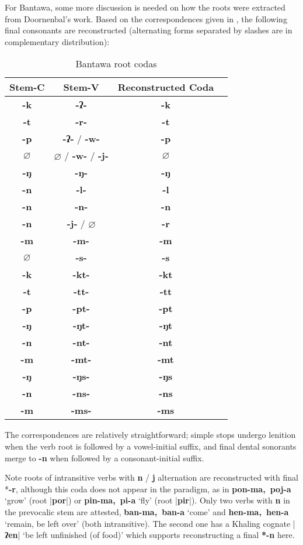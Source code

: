 \documentclass[oneside,a4paper,11pt]{article}
\newcommand{\ipa}[1]{\textbf{{\phon\mbox{#1}}}} %
\newcommand{\dhatu}[2]{|\ipa{#1}| `#2'}
\begin{document}
 For Bantawa, some more discussion is needed on how the roots were extracted from Doornenbal's work. Based on the correspondences given in \citet[129; 132]{doornenbal09}, the following final consonants are reconstructed (alternating forms separated by slashes are in complementary distribution):

\begin{table}[h]
\caption{Bantawa root codas} \centering \label{tab:bantawa.root}
\begin{tabular}{cccc}
\toprule
Stem-C & Stem-V & Reconstructed Coda \\
\midrule
\ipa{-k} & \ipa{-ʔ-} & \ipa{-k} \\
\ipa{-t} & \ipa{-r-} & \ipa{-t} \\
\ipa{-p} & \ipa{-ʔ-} /  \ipa{-w-} & \ipa{-p} \\
$\varnothing$ & $\varnothing$ / \ipa{-w-} / \ipa{-j-} & $\varnothing$ \\
\ipa{-ŋ} & \ipa{-ŋ-} & \ipa{-ŋ} \\
\ipa{-n} & \ipa{-l-} & \ipa{-l} \\
\ipa{-n} & \ipa{-n-}  & \ipa{-n} \\
\ipa{-n} & \ipa{-j-} / $\varnothing$ & \ipa{-r} \\
\ipa{-m} & \ipa{-m-} & \ipa{-m} \\
$\varnothing$ & \ipa{-s-} & \ipa{-s} \\
\midrule
\ipa{-k} & \ipa{-kt-} & \ipa{-kt} \\
\ipa{-t} & \ipa{-tt-} & \ipa{-tt} \\
\ipa{-p} & \ipa{-pt-} & \ipa{-pt} \\
\ipa{-ŋ} & \ipa{-ŋt-} & \ipa{-ŋt} \\
\ipa{-n} & \ipa{-nt-} & \ipa{-nt} \\
\ipa{-m} & \ipa{-mt-} & \ipa{-mt} \\
\midrule
\ipa{-ŋ} & \ipa{-ŋs-} & \ipa{-ŋs}  \\
\ipa{-n} & \ipa{-ns-} & \ipa{-ns} \\
\ipa{-m} & \ipa{-ms-} & \ipa{-ms}   \\
\bottomrule
\end{tabular}
\end{table}

The correspondences are relatively straightforward; simple stops undergo lenition when the verb root is followed by a vowel-initial suffix, and final dental sonorants merge to \ipa{-n} when followed by a consonant-initial suffix. 

Note roots of intransitive verbs with \ipa{n} / \ipa{j} alternation are reconstructed with final *\ipa{-r}, although this coda does not appear in the paradigm, as in \ipa{pon-ma, poj-a} `grow' (root |\ipa{por}|) or \ipa{pin-ma, pi-a} `fly' (root |\ipa{pir}|). Only two verbs with \ipa{n} in the prevocalic stem are attested, \ipa{ban-ma, ban-a} `come' and \ipa{hen-ma, hen-a} `remain, be left over' (both intransitive). The second one has a Khaling cognate \dhatu{ʔen}{be left unfinished (of food)} which supports reconstructing a final \ipa{*-n} here.
\end{document}
